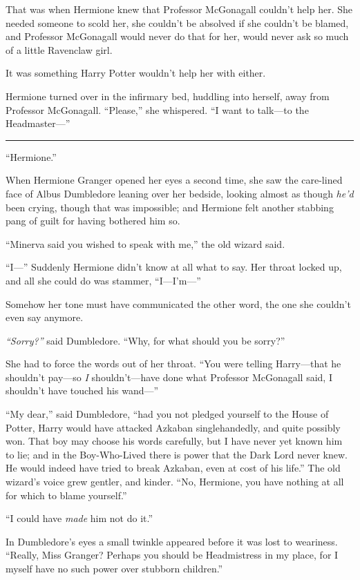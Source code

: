 That was when Hermione knew that Professor McGonagall couldn't help her.
She needed someone to scold her, she couldn't be absolved if she
couldn't be blamed, and Professor McGonagall would never do that for
her, would never ask so much of a little Ravenclaw girl.

It was something Harry Potter wouldn't help her with either.

Hermione turned over in the infirmary bed, huddling into herself, away
from Professor McGonagall. ``Please,'' she whispered. ``I want to
talk---to the Headmaster---''

\begin{center}\rule{3in}{0.4pt}\end{center}

``Hermione.''

When Hermione Granger opened her eyes a second time, she saw the
care-lined face of Albus Dumbledore leaning over her bedside, looking
almost as though \emph{he'd} been crying, though that was impossible;
and Hermione felt another stabbing pang of guilt for having bothered him
so.

``Minerva said you wished to speak with me,'' the old wizard said.

``I---'' Suddenly Hermione didn't know at all what to say. Her throat
locked up, and all she could do was stammer, ``I---I'm---''

Somehow her tone must have communicated the other word, the one she
couldn't even say anymore.

\emph{``Sorry?''} said Dumbledore. ``Why, for what should you be
sorry?''

She had to force the words out of her throat. ``You were telling
Harry---that he shouldn't pay---so \emph{I} shouldn't---have done what
Professor McGonagall said, I shouldn't have touched his wand---''

``My dear,'' said Dumbledore, ``had you not pledged yourself to the
House of Potter, Harry would have attacked Azkaban singlehandedly, and
quite possibly won. That boy may choose his words carefully, but I have
never yet known him to lie; and in the Boy-Who-Lived there is power that
the Dark Lord never knew. He would indeed have tried to break Azkaban,
even at cost of his life.'' The old wizard's voice grew gentler, and
kinder. ``No, Hermione, you have nothing at all for which to blame
yourself.''

``I could have \emph{made} him not do it.''

In Dumbledore's eyes a small twinkle appeared before it was lost to
weariness. ``Really, Miss Granger? Perhaps you should be Headmistress in
my place, for I myself have no such power over stubborn children.''

